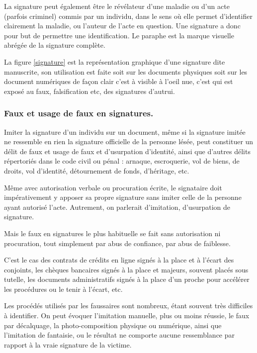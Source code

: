 				La signature peut également être le révélateur d'une maladie ou d'un acte (parfois criminel) commis par un individu, dans le sens où elle permet d'identifier clairement la maladie, ou l'auteur de l'acte en question. Une signature a donc pour but de permettre une identification. Le paraphe est la marque visuelle abrégée de la signature complète.
			
			    La figure \ref{signature} est la représentation graphique d'une signature dite manuscrite, son utilisation est faite soit sur les documents physiques soit sur les document numériques de façon clair c'est à visible à l'oeil nue, c'est qui est exposé au faux, falsification etc, des signatures d'autrui.
			\subsubsection{Faux et usage de faux en signatures.}
			    Imiter la signature d’un individu sur un document, même si la signature imitée ne ressemble en rien la signature officielle de la personne lésée, peut constituer un délit de faux et usage de faux et d’usurpation d’identité, ainsi que d’autres délits répertoriés dans le code civil ou pénal : arnaque, escroquerie, vol de biens, de droits, vol d’identité, détournement de fonds, d’héritage, etc.
			    
			    Même avec autorisation verbale ou procuration écrite, le signataire doit impérativement y apposer sa propre signature sans imiter celle de la personne ayant autorisé l’acte. Autrement, on parlerait d’imitation, d’usurpation de signature.

                Mais le faux en signatures le plus habituelle se fait sans autorisation ni procuration, tout simplement par abus de confiance, par abus de faiblesse.

                C’est le cas des contrats de crédits en ligne signés à la place et à l’écart des conjoints, les chèques bancaires signés à la place et majeurs, souvent placés sous tutelle, les documents administratifs signés à la place d’un proche pour accélérer les procédures ou le tenir à l’écart, etc.

                Les procédés utilisés par les faussaires sont nombreux, étant souvent très difficiles à identifier. On peut évoquer l’imitation manuelle, plus ou moins réussie, le faux par décalquage, la photo-composition physique ou numérique, ainsi que l’imitation de fantaisie, ou le résultat ne comporte aucune ressemblance par rapport à la vraie signature de la victime.
                
